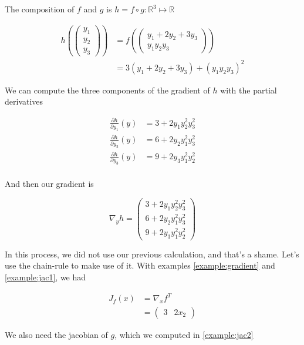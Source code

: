 \documentclass{tufte-handout}
\begin{document}
The composition of $ f $ and $ g $ is $ h = f \circ g : \mathbb{R}^3 \mapsto \mathbb{R} $

\begin{align*}
 h(\begin{pmatrix}
 y_1\\y_2\\y_3
 \end{pmatrix}) &= f(\begin{pmatrix}
 y_1 + 2y_2 + 3y_3 \\ y_1y_2y_3
 \end{pmatrix})\\
 &= 3(y_1 + 2y_2 + 3y_3) + (y_1y_2y_3)^2
\end{align*}

We can compute the three components of the gradient of $ h $ with the partial derivatives

\begin{align*}
\frac{\partial h}{\partial y_1}(y) &= 3 + 2y_1y_2^2y_3^2\\
\frac{\partial h}{\partial y_2}(y) &= 6 + 2y_2y_1^2y_3^2\\
\frac{\partial h}{\partial y_3}(y) &= 9 + 2y_3y_1^2y_2^2\\
\end{align*}

And then our gradient is 

$$ \nabla_y h = \begin{pmatrix}
3 + 2y_1y_2^2y_3^2 \\ 6 + 2y_2y_1^2y_3^2 \\ 9 + 2y_3y_1^2y_2^2
\end{pmatrix}  $$

In this process, we did not use our previous calculation, and that's a shame. Let's use the chain-rule to make use of it. With examples \ref{example:gradient} and \ref{example:jac1}, we had 


\begin{align*}
 J_f(x) &= \nabla_x f^T\\ 
 &= \begin{pmatrix}
3  & 2 x_2
\end{pmatrix}
\end{align*}

We also need the jacobian of $ g $, which we computed in \ref{example:jac2}
\end{document}
